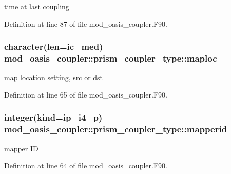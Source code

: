 time at last coupling 



Definition at line 87 of file mod\+\_\+oasis\+\_\+coupler.\+F90.

\hypertarget{structmod__oasis__coupler_1_1prism__coupler__type_aab6763e489b8ace8cff0fbe9e62cbcd8}{
\subsubsection[{maploc}]{\setlength{\rightskip}{0pt plus 5cm}character(len=ic\+\_\+med) mod\+\_\+oasis\+\_\+coupler\+::prism\+\_\+coupler\+\_\+type\+::maploc\hspace{0.3cm}{\ttfamily [private]}}}\label{structmod__oasis__coupler_1_1prism__coupler__type_aab6763e489b8ace8cff0fbe9e62cbcd8}


map location setting, src or dst 



Definition at line 65 of file mod\+\_\+oasis\+\_\+coupler.\+F90.

\hypertarget{structmod__oasis__coupler_1_1prism__coupler__type_ada880a13e931db47e72859515208ec1d}{
\subsubsection[{mapperid}]{\setlength{\rightskip}{0pt plus 5cm}integer(kind=ip\+\_\+i4\+\_\+p) mod\+\_\+oasis\+\_\+coupler\+::prism\+\_\+coupler\+\_\+type\+::mapperid\hspace{0.3cm}{\ttfamily [private]}}}\label{structmod__oasis__coupler_1_1prism__coupler__type_ada880a13e931db47e72859515208ec1d}


mapper I\+D 



Definition at line 64 of file mod\+\_\+oasis\+\_\+coupler.\+F90.

